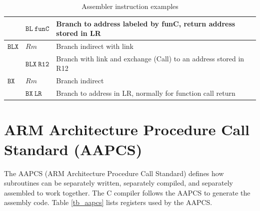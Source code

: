 \begin{table}
\begin{center}
\begin{tabular}{lll}
        & $\mathtt{BL~ funC}$
        & Branch to address labeled by funC, return address stored in LR\\ \hline
$\mathtt{BLX}$ & $\mathit{Rm}$ & Branch indirect with link \\
        & $\mathtt{BLX~ R12}$
        & Branch with link and exchange (Call) to an address stored in R12 \\ \hline
$\mathtt{BX}$ & $\mathit{Rm}$ & Branch indirect \\
        & $\mathtt{BX~ LR}$ 
        & Branch to address in LR, normally for function call return \\ \hline
\end{tabular}
\caption{Assembler instruction examples}
\label{tb_asm_instr}
\end{center}
\end{table}

\section{ARM Architecture Procedure Call Standard (AAPCS)}
The AAPCS (ARM Architecture Procedure Call Standard) defines how subroutines can be separately written, separately compiled, and separately assembled to work together. The C compiler follows the AAPCS to generate the assembly code. Table \ref{tb_aapcs} lists registers used by the AAPCS. 

